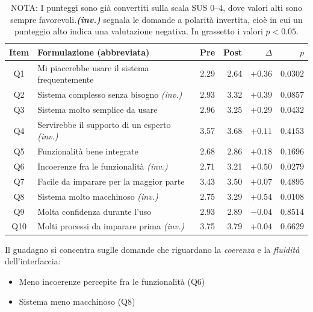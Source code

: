 \vspace{-2mm}
\begin{table}[h!]
	\centering
	\footnotesize
	\begin{tabular}{clrrrr}
		\toprule
		\textbf{Item} & \textbf{Formulazione (abbreviata)} & \textbf{Pre} & \textbf{Post} & $\Delta$ & $p$ \\
		\midrule
		Q1  & Mi piacerebbe usare il sistema frequentemente & 2.29 & 2.64 & $+0.36$ & $\mathbf{0.0302}$ \\
		Q2  & Sistema complesso senza bisogno \textit{(inv.)} & 2.93 & 3.32 & $+0.39$ & $0.0857$ \\
		Q3  & Sistema molto semplice da usare & 2.96 & 3.25 & $+0.29$ & $\mathbf{0.0432}$ \\
		Q4  & Servirebbe il supporto di un esperto \textit{(inv.)} & 3.57 & 3.68 & $+0.11$ & $0.4153$ \\
		Q5  & Funzionalità bene integrate & 2.68 & 2.86 & $+0.18$ & $0.1696$ \\
		Q6  & Incoerenze fra le funzionalità \textit{(inv.)} & 2.71 & 3.21 & $+0.50$ & $\mathbf{0.0279}$ \\
		Q7  & Facile da imparare per la maggior parte & 3.43 & 3.50 & $+0.07$ & $0.4895$ \\
		Q8  & Sistema molto macchinoso \textit{(inv.)} & 2.75 & 3.29 & $+0.54$ & $\mathbf{0.0108}$ \\
		Q9  & Molta confidenza durante l'uso & 2.93 & 2.89 & $-0.04$ & $0.8514$ \\
		Q10 & Molti processi da imparare prima \textit{(inv.)} & 3.75 & 3.79 & $+0.04$ & $0.6629$ \\
		\bottomrule
	\end{tabular}
	\caption*{\small NOTA: I punteggi sono già convertiti sulla scala SUS 0--4, dove valori alti sono sempre favorevoli.\textbf{\textit{(inv.)}} segnala le domande a polarità invertita, cioè in cui un punteggio alto indica una valutazione negativa. In grassetto i valori $p<0.05$.}
\end{table}

\noindent
Il guadagno si concentra suglle domande che riguardano la \emph{coerenza} e la \emph{fluidità} dell'interfaccia:
\begin{itemize}
	\item Meno incoerenze percepite fra le funzionalità (Q6)
	\item Sistema meno macchinoso (Q8)
\end{itemize}

